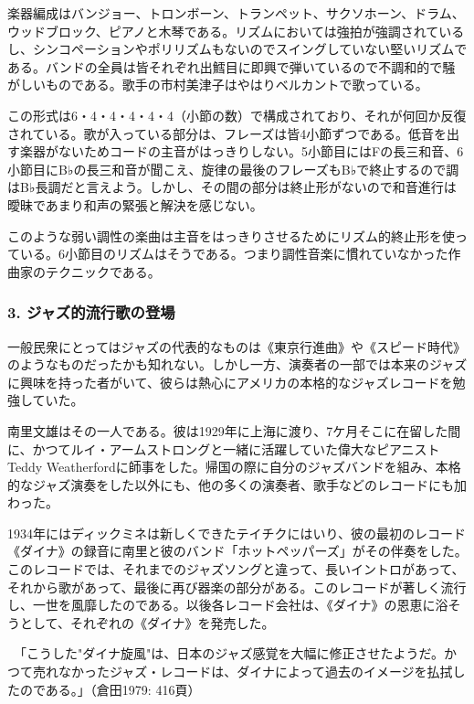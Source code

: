 楽器編成はバンジョー、トロンボーン、トランペット、サクソホーン、ドラム、ウッドブロック、ピアノと木琴である。リズムにおいては強拍が強調されているし、シンコペーションやポリリズムもないのでスイングしていない堅いリズムである。バンドの全員は皆それぞれ出鱈目に即興で弾いているので不調和的で騒がしいものである。歌手の市村美津子はやはりベルカントで歌っている。

この形式は6・4・4・4・4・4（小節の数）で構成されており、それが何回か反復されている。歌が入っている部分は、フレーズは皆4小節ずつである。低音を出す楽器がないためコードの主音がはっきりしない。5小節目にはFの長三和音、6小節目にB♭の長三和音が聞こえ、旋律の最後のフレーズもB♭で終止するので調はB♭長調だと言えよう。しかし、その間の部分は終止形がないので和音進行は曖昧であまり和声の緊張と解決を感じない。

このような弱い調性の楽曲は主音をはっきりさせるためにリズム的終止形を使っている。6小節目のリズムはそうである。つまり調性音楽に慣れていなかった作曲家のテクニックである。

\subsubsection{3. ジャズ的流行歌の登場}

一般民衆にとってはジャズの代表的なものは《東京行進曲》や《スピード時代》のようなものだったかも知れない。しかし一方、演奏者の一部では本来のジャズに興味を持った者がいて、彼らは熱心にアメリカの本格的なジャズレコードを勉強していた。

南里文雄はその一人である。彼は1929年に上海に渡り、7ケ月そこに在留した間に、かつてルイ・アームストロングと一緒に活躍していた偉大なピアニストTeddy Weatherfordに師事をした。帰国の際に自分のジャズバンドを組み、本格的なジャズ演奏をした以外にも、他の多くの演奏者、歌手などのレコードにも加わった。

1934年にはディックミネは新しくできたテイチクにはいり、彼の最初のレコード《ダイナ》の録音に南里と彼のバンド「ホットペッパーズ」がその伴奏をした。このレコードでは、それまでのジャズソングと違って、長いイントロがあって、それから歌があって、最後に再び器楽の部分がある。このレコードが著しく流行し、一世を風靡したのである。以後各レコード会社は、《ダイナ》の恩恵に浴そうとして、それぞれの《ダイナ》を発売した。

\begin{gquote}
　「こうした"ダイナ旋風"は、日本のジャズ感覚を大幅に修正させたようだ。かつて売れなかったジャズ・レコードは、ダイナによって過去のイメージを払拭したのである。」（倉田1979: 416頁）
\end{gquote}

